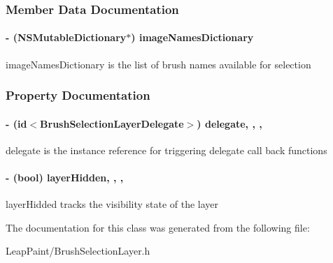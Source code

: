 \subsubsection{Member Data Documentation}
\hypertarget{interface_brush_selection_layer_a4ec74d274a54411ce95f3168ee5823ba}{
\paragraph[{image\-Names\-Dictionary}]{\setlength{\rightskip}{0pt plus 5cm}-\/ (N\-S\-Mutable\-Dictionary$\ast$) image\-Names\-Dictionary\hspace{0.3cm}{\ttfamily [protected]}}}\label{d5/d83/interface_brush_selection_layer_a4ec74d274a54411ce95f3168ee5823ba}
image\-Names\-Dictionary is the list of brush names available for selection 

\subsubsection{Property Documentation}
\hypertarget{interface_brush_selection_layer_a777a4f065988aee06e9a46ccd0ffb10a}{
\paragraph[{delegate}]{\setlength{\rightskip}{0pt plus 5cm}-\/ (id$<${\bf Brush\-Selection\-Layer\-Delegate}$>$) delegate\hspace{0.3cm}{\ttfamily [read]}, {\ttfamily [write]}, {\ttfamily [nonatomic]}, {\ttfamily [weak]}}}\label{d5/d83/interface_brush_selection_layer_a777a4f065988aee06e9a46ccd0ffb10a}
delegate is the instance reference for triggering delegate call back functions \hypertarget{interface_brush_selection_layer_aaf6677a075014de2c2b0abe254b241a6}{
\paragraph[{layer\-Hidden}]{\setlength{\rightskip}{0pt plus 5cm}-\/ (bool) layer\-Hidden\hspace{0.3cm}{\ttfamily [read]}, {\ttfamily [write]}, {\ttfamily [nonatomic]}, {\ttfamily [assign]}}}\label{d5/d83/interface_brush_selection_layer_aaf6677a075014de2c2b0abe254b241a6}
layer\-Hidded tracks the visibility state of the layer 

The documentation for this class was generated from the following file\-:\begin{DoxyCompactItemize}
\item 
Leap\-Paint/Brush\-Selection\-Layer.\-h\end{DoxyCompactItemize}
